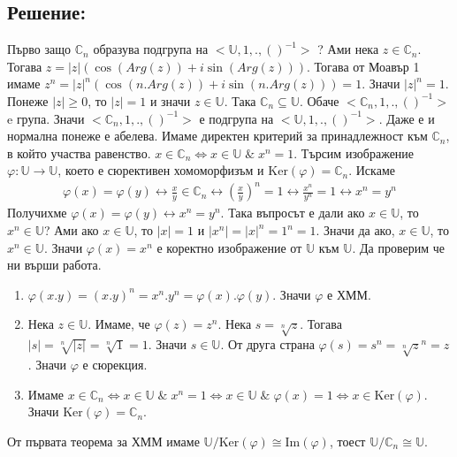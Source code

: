 \documentclass[12pt]{article}
\begin{document}
\subsection{Решение:}
Първо защо \(\mathbb{C}_n\) образува подгрупа на \(<\mathbb{U}, 1, . , ()^{-1}>\) ?
Ами нека \(z \in \mathbb{C}_n\). Тогава \(z = |z|\left(\cos\left(Arg(z)\right) + i\sin\left(Arg(z)\right)\right)\). Тогава от Моавър 1 имаме
\(z^n = |z|^n\left(\cos\left(n.Arg(z)\right) + i\sin\left(n.Arg(z)\right)\right) = 1\).
Значи \(|z|^n = 1\). Понеже \(|z| \geq 0\), то \(|z| = 1\) и значи \(z \in \mathbb{U}\).
Така \(\mathbb{C}_n \subseteq \mathbb{U}\).
Обаче \(<\mathbb{C}_n, 1, . , ()^{-1}>\) e група.
Значи \(<\mathbb{C}_n, 1, . , ()^{-1}>\) е подгрупа на \(<\mathbb{U}, 1, . , ()^{-1}>\).
Даже е и нормална понеже е абелева.
Имаме директен критерий за принадлежност към \(\mathbb{C}_n\), в който участва равенство.
\(x \in \mathbb{C}_n \iff x \in \mathbb{U} \; \& \; x^n = 1\).
Търсим изображение \(\varphi : \mathbb{U} \to \mathbb{U}\),
    което е сюрективен хомоморфизъм и \(\mathrm{Ker}(\varphi) = \mathbb{C}_n\).
Искаме \begin{align*}
        \varphi(x) = \varphi(y) \longleftrightarrow 
        \displaystyle\frac{x}{y} \in \mathbb{C}_n \longleftrightarrow 
        \left(\displaystyle\frac{x}{y}\right)^n = 1 \longleftrightarrow
        \displaystyle\frac{x^n}{y^n} = 1 \longleftrightarrow
        x^n = y^n
    \end{align*}
    Получихме \(\varphi(x) = \varphi(y) \longleftrightarrow x^n = y^n\).
    Така въпросът е дали ако \(x \in \mathbb{U}\), то \(x^n \in \mathbb{U}\)?
    Ами ако \(x \in \mathbb{U}\), то \(|x| = 1\) и \(|x^n| = |x|^n = 1^n = 1\).
    Значи да ако, \(x \in \mathbb{U}\), то \(x^n \in \mathbb{U}\).
    Значи \(\varphi(x) = x^n\) е коректно изображение от \(\mathbb{U}\) към \(\mathbb{U}\). Да проверим че ни върши работа.
    \begin{enumerate}
        \item \(\varphi(x.y) = (x.y)^n = x^n . y^n = \varphi(x) . \varphi(y)\). Значи \(\varphi\) е ХММ.
        \item Нека \(z \in \mathbb{U}\). Имаме, че \(\varphi(z) = z^n\).
        Нека \(s = \sqrt[n]{z}\). Тогава \(|s| = \sqrt[n]{|z|} = \sqrt[n]{1} = 1\).
        Значи \(s \in \mathbb{U}\).
        От друга страна \(\varphi(s) = s^n = \sqrt[n]{z}^n = z\). Значи \(\varphi\) е сюрекция.
        \item Имаме \(x \in \mathbb{C}_n \iff x \in \mathbb{U} \; \& \; x^n = 1 \iff x \in \mathbb{U} \; \& \; \varphi(x) = 1 \iff x \in \mathrm{Ker}(\varphi)\).
        Значи \(\mathrm{Ker}(\varphi) = \mathbb{C}_n\).
    \end{enumerate}
    От първата теорема за ХММ имаме \(\mathbb{U} / \mathrm{Ker}(\varphi) \cong \mathrm{Im}(\varphi)\), тоест \(\mathbb{U} / \mathbb{C}_n \cong \mathbb{U}\).
\end{document}
